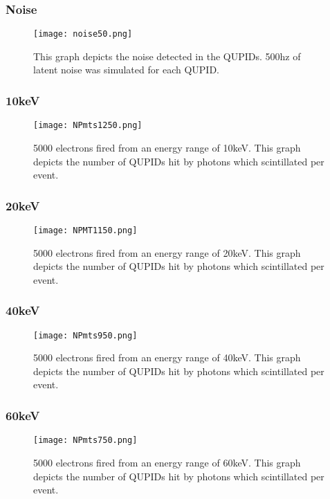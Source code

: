 \documentclass[11pt,a4paper,oneside]{report}
\begin{document}
\newpage
\subsubsection{Noise}
\begin{figure}[htb]
\centering
\texttt{[image: noise50.png]}
\caption{This graph depicts the noise detected in the QUPIDs. 500hz of latent noise was simulated for each QUPID.}
\end{figure}

\subsubsection{10keV}
\begin{figure}[htb]
\centering
\texttt{[image: NPmts1250.png]}
\caption{5000 electrons fired from an energy range of 10keV. This graph depicts the number of QUPIDs hit by photons which scintillated per event.}
\end{figure}

\newpage
\subsubsection{20keV}
\begin{figure}[htb]
\centering
\texttt{[image: NPMT1150.png]}
\caption{5000 electrons fired from an energy range of 20keV. This graph depicts the number of QUPIDs hit by photons which scintillated per event.}
\end{figure}


\subsubsection{40keV}
\begin{figure}[htb]
\centering
\texttt{[image: NPmts950.png]}
\caption{5000 electrons fired from an energy range of 40keV. This graph depicts the number of QUPIDs hit by photons which scintillated per event.}
\end{figure}

\newpage
\subsubsection{60keV}
\begin{figure}[htb]
\centering
\texttt{[image: NPmts750.png]}
\caption{5000 electrons fired from an energy range of 60keV. This graph depicts the number of QUPIDs hit by photons which scintillated per event.}
\end{figure}
\end{document}
